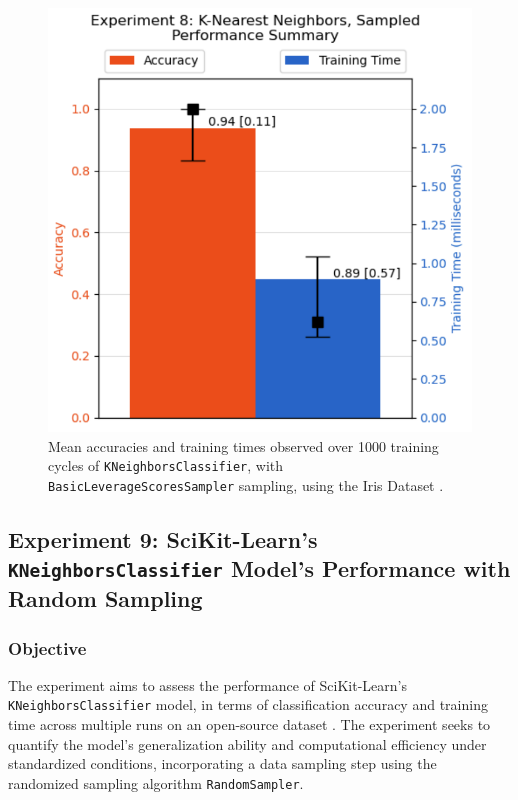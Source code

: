 \documentclass{article}
\theoremstyle{plain}
\theoremstyle{definition}
\theoremstyle{remark}
\begin{document}
\begin{figure}[ht]
	\vskip 0.2in
	\begin{center}
		\centerline{\includegraphics[width=\columnwidth]{experiment_08}}
		\caption{Mean accuracies and training times observed over 1000 training cycles of \texttt{KNeighborsClassifier}, with \texttt{BasicLeverageScoresSampler} sampling, using the Iris Dataset \cite{iris}.}
		\label{experiment_08}
	\end{center}
	\vskip -0.2in
\end{figure}


\subsection{Experiment 9: SciKit-Learn's \texttt{KNeighborsClassifier} Model's Performance with Random Sampling}

\subsubsection{Objective}

The experiment aims to assess the performance of SciKit-Learn's \texttt{KNeighborsClassifier} model, in terms of classification accuracy and training time across multiple runs on an open-source dataset \cite{iris}. The experiment seeks to quantify the model's generalization ability and computational efficiency under standardized conditions, incorporating a data sampling step using the randomized sampling algorithm \texttt{RandomSampler}.
\end{document}
